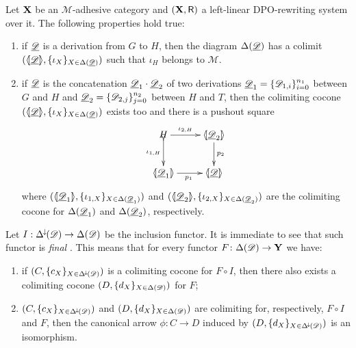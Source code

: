 \begin{lemma}\label{lem:colim}
	Let $\textbf {\textup{X}}$ be an $\mathcal{M}$-adhesive category and $(\textbf {\textup{X}}, \mathsf{R})$ a left-linear DPO-rewriting system over it. The following properties hold true:
	\begin{enumerate}
		\item  if $\underline{\mathscr{D}}$ is a derivation from $G$ to $H$, then the diagram $\Delta(\underline{\mathscr{D}})$ has a colimit $(\langle \hspace{-1.85pt}[ \underline{\mathscr{D}}]\hspace{-1.85pt}\rangle, \{\iota_X\}_{X\in \Delta(\underline{\mathscr{D}})})$ such that $\iota_H$ belongs to $\mathcal{M}$.
		\item if $\underline{\mathscr{D}}$ is the concatenation $\underline{\mathscr{D}}_1\cdot \underline{\mathscr{D}}_2$ of two derivations $\underline{\mathscr{D}}_1=\{\mathscr{D}_{1,i}\}_{i=0}^{n_1}$ between $G$ and $H$ and $\underline{\mathscr{D}}_2=\{\mathscr{D}_{2,j}\}_{j=0}^{n_2}$ between $H$ and $T$,  then the colimiting cocone $(\langle \hspace{-1.85pt}[ \underline{\mathscr{D}}]\hspace{-1.85pt}\rangle, \{\iota_X\}_{X\in \Delta(\underline{\mathscr{D}})})$ exists too and there is a pushout square
		\[\xymatrix{H\ar[r]^-{\iota_{2, H}} \ar@{>->}[d]_-{\iota_{1, H}} & \tproi{D}{2} \ar[d]^{p_2}\\  \tproi{D}{1} \ar[r]_{p_1}& \tpro{D}}\]
		where $(\langle \hspace{-1.85pt}[ \underline{\mathscr{D}}_{1}]\hspace{-1.85pt}\rangle, \{\iota_{1, X}\}_{X\in \Delta(\underline{\mathscr{D}}_1)})$ and $(\langle \hspace{-1.85pt}[ \underline{\mathscr{D}}_{2}]\hspace{-1.85pt}\rangle, \{\iota_{2, X}\}_{X\in \Delta(\underline{\mathscr{D}}_2)})$ are the colimiting cocone for $\Delta(\underline{\mathscr{D}}_1)$ and $\Delta(\underline{\mathscr{D}}_2)$, respectively.
	\end{enumerate}
\end{lemma}
\begin{remark}\label{rem:cof}
Let $I:\Delta^{\hspace{-1pt}\downarrow\hspace{-1pt}}(\mathscr{D})\to \Delta(\mathscr{D})$ be the inclusion functor. It is immediate to see that such functor is \emph{final} \cite{mac2013categories}. This means that for every functor $F\colon \Delta(\mathscr{D})\to \textbf {\textup{Y}}$ we have:
\begin{enumerate}
	\item if  $(C, \{c_X\}_{X\in \Delta^{\hspace{-1pt}\downarrow\hspace{-1pt}}(\mathscr{D})})$ is a colimiting cocone for $F\circ I$, then there also exists a colimiting cocone $(D, \{d_X\}_{X\in \Delta(\mathscr{D})})$ for $F$;
	\item $(C, \{c_X\}_{X\in \Delta^{\hspace{-1pt}\downarrow\hspace{-1pt}}(\mathscr{D})})$ and $(D, \{d_X\}_{X\in \Delta(\mathscr{D})})$ are colimiting for, respectively, $F\circ I$ and $F$, then the canonical arrow $\phi\colon C\to D$ induced by $(D, \{d_X\}_{X\in \Delta^{\hspace{-1pt}\downarrow\hspace{-1pt}}(\mathscr{D})})$ is an isomorphism.
\end{enumerate}
\end{remark}

